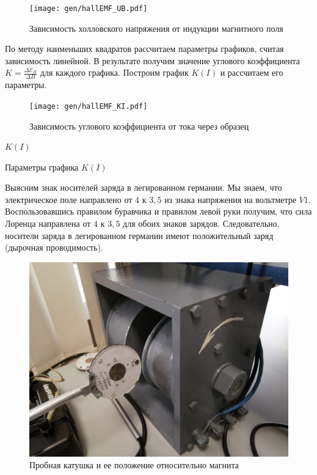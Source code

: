 \documentclass[12pt,a4paper]{article}
\begin{document}
	\begin{figure}[H]
		\texttt{[image: gen/hallEMF\_UB.pdf]}
		\caption{Зависимость холловского напряжения от индукции магнитного поля}
	\end{figure}

	По методу наименьших квадратов рассчитаем параметры графиков, считая зависимость линейной. В результате получим значение углового коэффициента $K = \frac{\Delta \mathcal{E}_H}{\Delta B}$ для каждого графика. Построим график $K(I)$ и рассчитаем его параметры.
	
	\begin{figure}[H]
		\texttt{[image: gen/hallEMF\_KI.pdf]}
		\caption{Зависимость углового коэффициента от тока через образец}
	\end{figure}
	
	\begin{table}[h]
		\caption{$K(I)$}
		
	\end{table}
	
	\begin{table}[h]
		\caption{Параметры графика $K(I)$}
		
	\end{table}

	Выясним знак носителей заряда в легированном германии. Мы знаем, что электрическое поле направлено от $4$ к $3,5$ из знака напряжения на вольтметре $V1$. Воспользовавшись правилом буравчика и правилом левой руки получим, что сила Лоренца направлена от $4$ к $3,5$ для обоих знаков зарядов. Следовательно, носители заряда в легированном германии имеют положительный заряд (дырочная проводимость).
	
	\begin{figure}[H]
		\includegraphics[scale = 0.25]{res/probe_coil.jpg}
		\caption{Пробная катушка и ее положение относительно магнита}
	\end{figure}
	
\end{document}
